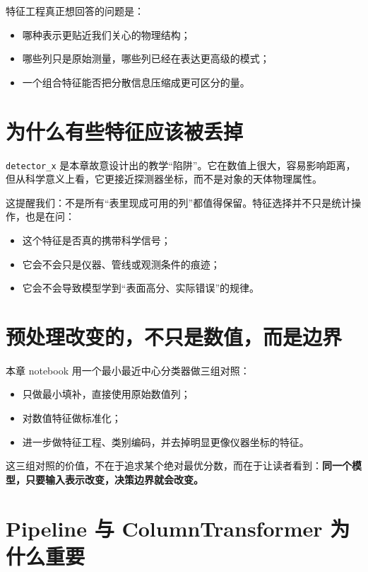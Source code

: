 特征工程真正想回答的问题是：

\begin{itemize}
    \item 哪种表示更贴近我们关心的物理结构；
    \item 哪些列只是原始测量，哪些列已经在表达更高级的模式；
    \item 一个组合特征能否把分散信息压缩成更可区分的量。
\end{itemize}

\section{为什么有些特征应该被丢掉}

\texttt{detector\_x} 是本章故意设计出的教学“陷阱”。它在数值上很大，容易影响距离，但从科学意义上看，它更接近探测器坐标，而不是对象的天体物理属性。

这提醒我们：不是所有“表里现成可用的列”都值得保留。特征选择并不只是统计操作，也是在问：

\begin{itemize}
    \item 这个特征是否真的携带科学信号；
    \item 它会不会只是仪器、管线或观测条件的痕迹；
    \item 它会不会导致模型学到“表面高分、实际错误”的规律。
\end{itemize}

\section{预处理改变的，不只是数值，而是边界}

本章 notebook 用一个最小最近中心分类器做三组对照：

\begin{itemize}
    \item 只做最小填补，直接使用原始数值列；
    \item 对数值特征做标准化；
    \item 进一步做特征工程、类别编码，并去掉明显更像仪器坐标的特征。
\end{itemize}

这三组对照的价值，不在于追求某个绝对最优分数，而在于让读者看到：\textbf{同一个模型，只要输入表示改变，决策边界就会改变。}

\section{Pipeline 与 ColumnTransformer 为什么重要}

